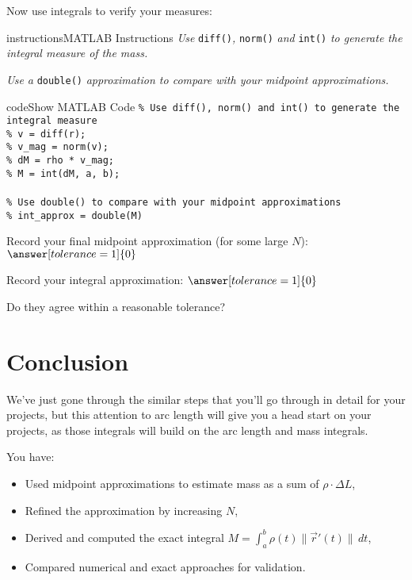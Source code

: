 \documentclass{ximera}
\begin{document}
Now use integrals to verify your measures:

\begin{expandable}{instructions}{MATLAB Instructions}
\textit{Use} \texttt{diff()}\textit{,} \texttt{norm()} \textit{and} \texttt{int()} \textit{to generate the integral measure of the mass.}

\textit{Use a} \texttt{double()} \textit{approximation to compare with your midpoint approximations.}
\end{expandable}

\begin{expandable}{code}{Show MATLAB Code}
\texttt{\% Use diff(), norm() and int() to generate the integral measure}\\
\texttt{\% v = diff(r);}\\
\texttt{\% v\_mag = norm(v);}\\
\texttt{\% dM = rho * v\_mag;}\\
\texttt{\% M = int(dM, a, b);}\\
\\
\texttt{\% Use double() to compare with your midpoint approximations}\\
\texttt{\% int\_approx = double(M)}
\end{expandable}

\begin{problem}
Record your final midpoint approximation (for some large $N$): $\answer[tolerance=1]{0}$

Record your integral approximation: $\answer[tolerance=1]{0}$

Do they agree within a reasonable tolerance? 
\end{problem}

\section*{Conclusion}

We've just gone through the similar steps that you'll go through in detail for your projects, but this attention to arc length will give you a head start on your projects, as those integrals will build on the arc length and mass integrals.

You have:
\begin{itemize}
\item Used midpoint approximations to estimate mass as a sum of $\rho \cdot \Delta L$,
\item Refined the approximation by increasing $N$,
\item Derived and computed the exact integral $M = \int_a^b \rho(t) \|\vec{r}'(t)\| \, dt$,
\item Compared numerical and exact approaches for validation.
\end{itemize}
\end{document}
